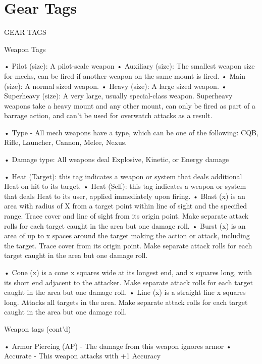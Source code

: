 \section{Gear Tags}

      GEAR TAGS

Weapon Tags

•  \hypertarget{Pilot}{Pilot (size)}: A pilot-scale weapon
•  \hypertarget{Auxiliary}{Auxiliary (size)}: The smallest weapon size for mechs, can be fired if another weapon on the
  same mount is fired.
•  \hypertarget{Main}{Main (size)}: A normal sized weapon.
•  \hypertarget{Heavy}{Heavy (size)}: A large sized weapon.
•  \hypertarget{Superheavy}{Superheavy (size)}: A very large, usually special-class weapon. Superheavy weapons take a
  heavy mount and any other mount, can only be fired as part of a barrage action, and can’t be
  used for overwatch attacks as a result.

•  \hypertarget{Type}{Type} - All mech weapons have a type, which can be one of the following: CQB, Rifle,
  Launcher, Cannon, Melee, Nexus.

•  \hypertarget{DamageType}{Damage type}: All weapons deal Explosive, Kinetic, or Energy damage


•  \hypertarget{HeatTarget}{Heat (Target)}: this tag indicates a weapon or system that deals additional Heat on hit to its
  target.
•  Heat (Self): this tag indicates a weapon or system that deals Heat to its user, applied
  immediately upon firing.
•  \hypertarget{Blast}{Blast (x)} is an area with radius of X from a target point within line of sight and the specified
  range. Trace cover and line of sight from its origin point. Make separate attack rolls for each
  target caught in the area but one damage roll.
•  \hypertarget{Burst}{Burst (x)} is an area of up to x spaces around the target making the action or attack, including
  the target. Trace cover from its origin point. Make separate attack rolls for each target caught in
  the area but one damage roll.

•  \hypertarget{Cone}{Cone (x)} is a cone x squares wide at its longest end, and x squares long, with its short end
  adjacent to the attacker. Make separate attack rolls for each target caught in the area but one
  damage roll.
•  \hypertarget{Line}{Line (x)} is a straight line x squares long. Attacks all targets in the area. Make separate attack
  rolls for each target caught in the area but one damage roll.

Weapon tags (cont’d)

•  \hypertarget{AP}{Armor Piercing (AP)} - The damage from this weapon ignores armor
•  \hypertarget{Accurate}{Accurate} - This weapon attacks with +1 Accuracy

